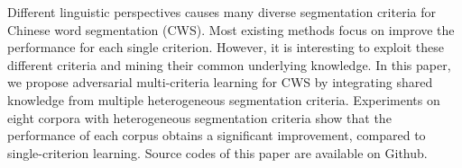 Different linguistic perspectives causes many diverse segmentation criteria for Chinese word segmentation (CWS). Most existing methods focus on improve the performance for each single criterion. However, it is interesting to exploit these different criteria and mining their common underlying knowledge. In this paper, we propose adversarial multi-criteria learning for CWS by integrating shared knowledge from multiple heterogeneous segmentation criteria. Experiments on eight corpora with heterogeneous segmentation criteria show that the performance of each corpus obtains a significant improvement, compared to single-criterion learning. Source codes of this paper are available on Github.
